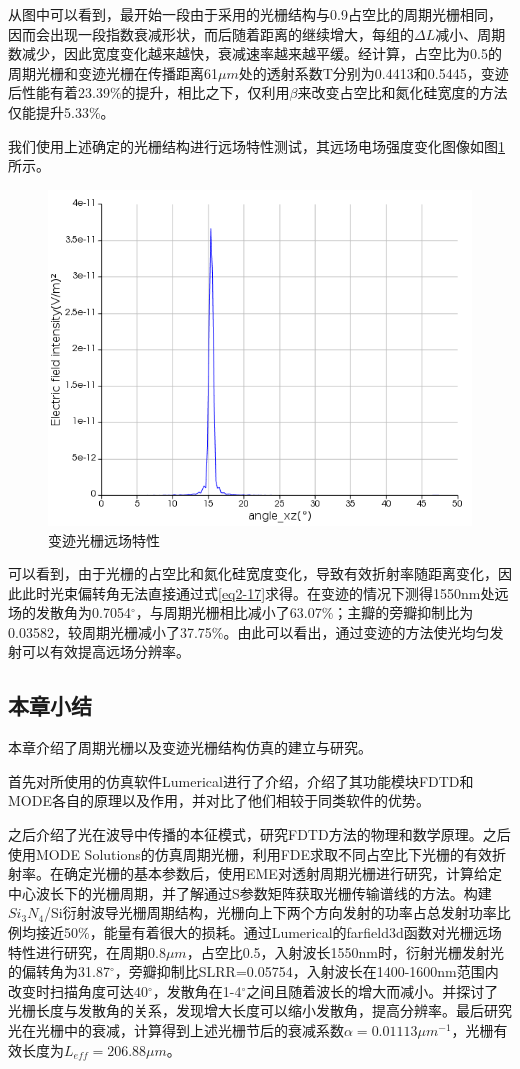 \documentclass[UTF8,a4paper,12pt]{ctexart}
\numberwithin{equation}{section}
\begin{document}
 从图中可以看到，最开始一段由于采用的光栅结构与0.9占空比的周期光栅相同，因而会出现一段指数衰减形状，而后随着距离的继续增大，每组的$\Delta L$减小、周期数减少，因此宽度变化越来越快，衰减速率越来越平缓。经计算，占空比为0.5的周期光栅和变迹光栅在传播距离61$\mu m$处的透射系数T分别为0.4413和0.5445，变迹后性能有着23.39\%的提升，相比之下，仅利用$\beta$来改变占空比和氮化硅宽度的方法仅能提升5.33\%。

我们使用上述确定的光栅结构进行远场特性测试，其远场电场强度变化图像如图\ref{3-24}所示。
\begin{figure}[htbp]
\centering
\includegraphics[width=0.7\linewidth]{fig39.png}
\caption{变迹光栅远场特性}
\label{3-24}
\end{figure}

\noindent 可以看到，由于光栅的占空比和氮化硅宽度变化，导致有效折射率随距离变化，因此此时光束偏转角无法直接通过式\ref{eq2-17}求得。在变迹的情况下测得1550nm处远场的发散角为0.7054$^\circ$，与周期光栅相比减小了63.07\%；主瓣的旁瓣抑制比为0.03582，较周期光栅减小了37.75\%。由此可以看出，通过变迹的方法使光均匀发射可以有效提高远场分辨率。



\subsection{本章小结}
本章介绍了周期光栅以及变迹光栅结构仿真的建立与研究。

首先对所使用的仿真软件Lumerical进行了介绍，介绍了其功能模块FDTD和MODE各自的原理以及作用，并对比了他们相较于同类软件的优势。

之后介绍了光在波导中传播的本征模式，研究FDTD方法的物理和数学原理。之后使用MODE Solutions的仿真周期光栅，利用FDE求取不同占空比下光栅的有效折射率。在确定光栅的基本参数后，使用EME对透射周期光栅进行研究，计算给定中心波长下的光栅周期，并了解通过S参数矩阵获取光栅传输谱线的方法。构建$Si_3N_4$/Si衍射波导光栅周期结构，光栅向上下两个方向发射的功率占总发射功率比例均接近50\%，能量有着很大的损耗。通过Lumerical的farfield3d函数对光栅远场特性进行研究，在周期0.8$\mu m$，占空比0.5，入射波长1550nm时，衍射光栅发射光的偏转角为31.87$^\circ$，旁瓣抑制比SLRR=0.05754，入射波长在1400-1600nm范围内改变时扫描角度可达40$^\circ$，发散角在1-4$^\circ$之间且随着波长的增大而减小。并探讨了光栅长度与发散角的关系，发现增大长度可以缩小发散角，提高分辨率。最后研究光在光栅中的衰减，计算得到上述光栅节后的衰减系数$\alpha=0.01113\mu m^{-1}$，光栅有效长度为$L_{eff}=206.88\mu m$。
\end{document}
